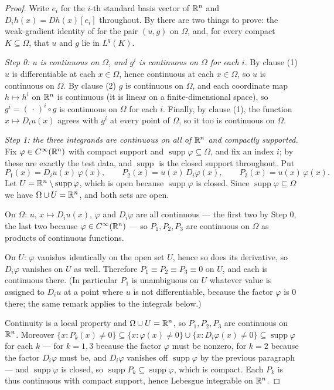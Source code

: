 \begin{proof}
Write $e_i$ for the $i$-th standard basis vector of $\mathbb{R}^n$ and
$D_ih(x)=Dh(x)[e_i]$ throughout.  By  there are two things
to prove: the weak-gradient identity of  for the pair
$(u,g)$ on $\Omega$, and, for every compact $K\subseteq\Omega$, that $u$ and $g$
lie in $L^q(K)$.

\emph{Step 0: $u$ is continuous on $\Omega$, and $g^i$ is continuous on
$\Omega$ for each $i$.}  By clause (1) $u$ is differentiable at each $x\in\Omega$,
hence continuous at each $x\in\Omega$, so $u$ is continuous on $\Omega$.  By
clause (2) $g$ is continuous on $\Omega$, and each coordinate map
$h\mapsto h^i$ on $\mathbb{R}^n$ is continuous (it is linear on a finite-dimensional
space), so $g^i=(\,\cdot\,)^i\circ g$ is continuous on $\Omega$ for each $i$.
Finally, by clause (1), the function $x\mapsto D_iu(x)$ agrees with $g^i$ at
every point of $\Omega$, so it too is continuous on $\Omega$.

\emph{Step 1: the three integrands are continuous on all of $\mathbb{R}^n$ and
compactly supported.}  Fix $\varphi\in C^\infty(\mathbb{R}^n)$ with compact support and
$\operatorname{supp}\varphi\subseteq\Omega$, and fix an index $i$; by
 these are exactly the test data, and
$\operatorname{supp}$ is the closed support throughout.  Put
\[
P_1(x)=D_iu(x)\,\varphi(x),\qquad
P_2(x)=u(x)\,D_i\varphi(x),\qquad
P_3(x)=u(x)\,\varphi(x).
\]
Let $U=\mathbb{R}^n\setminus\operatorname{supp}\varphi$, which is open because
$\operatorname{supp}\varphi$ is closed.  Since
$\operatorname{supp}\varphi\subseteq\Omega$ we have $\Omega\cup U=\mathbb{R}^n$, and
both sets are open.

On $\Omega$: $u$, $x\mapsto D_iu(x)$, $\varphi$ and $D_i\varphi$ are all
continuous --- the first two by Step 0, the last two because
$\varphi\in C^\infty(\mathbb{R}^n)$ --- so $P_1,P_2,P_3$ are continuous on $\Omega$ as
products of continuous functions.

On $U$: $\varphi$ vanishes identically on the open set $U$, hence so does its
derivative, so $D_i\varphi$ vanishes on $U$ as well.  Therefore
$P_1\equiv P_2\equiv P_3\equiv0$ on $U$, and each is continuous there.  (In
particular $P_1$ is unambiguous on $U$ whatever value is assigned to $D_iu$ at a
point where $u$ is not differentiable, because the factor $\varphi$ is $0$
there; the same remark applies to the integrals below.)

Continuity is a local property and $\Omega\cup U=\mathbb{R}^n$, so $P_1,P_2,P_3$ are
continuous on $\mathbb{R}^n$.  Moreover
$\{x:P_k(x)\ne0\}\subseteq\{x:\varphi(x)\ne0\}\cup\{x:D_i\varphi(x)\ne0\}
\subseteq\operatorname{supp}\varphi$ for each $k$ --- for $k=1,3$ because the
factor $\varphi$ must be nonzero, for $k=2$ because the factor $D_i\varphi$
must be, and $D_i\varphi$ vanishes off $\operatorname{supp}\varphi$ by the
previous paragraph --- and $\operatorname{supp}\varphi$ is closed, so
$\operatorname{supp}P_k\subseteq\operatorname{supp}\varphi$, which is compact.
Each $P_k$ is thus continuous with compact support, hence Lebesgue integrable on
$\mathbb{R}^n$.


\end{proof}
